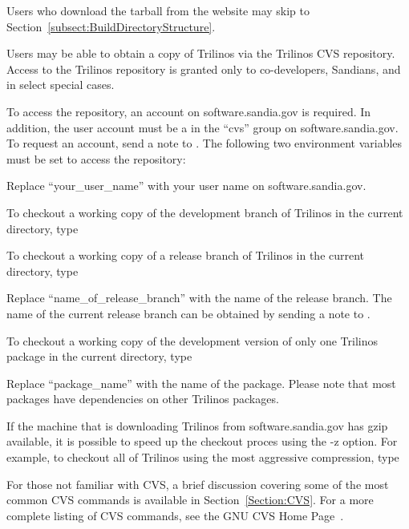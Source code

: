 \documentclass[12pt,relax]{TrilinosUserGuide}
\begin{document}
Users who download the tarball from the website may skip to 
Section~\ref{subsect:BuildDirectoryStructure}. 

Users may be able to obtain a 
copy of Trilinos via the Trilinos CVS repository.  Access to the Trilinos 
repository is granted only to co-developers, Sandians, and in select 
special cases.

To access the repository, an account on software.sandia.gov is required.  In 
addition, the user account must be a in the ``cvs'' group 
on software.sandia.gov.  To request an account, send a note 
to .  
The following two environment variables must be set to access the repository:


Replace ``your\_user\_name'' with your user name on software.sandia.gov.

To checkout a working copy of the development branch of Trilinos in the 
current directory, type


To checkout a working copy of a release branch of Trilinos in the current 
directory, type


Replace ``name\_of\_release\_branch'' with the name of the release branch.
The name of the current release branch can be obtained by sending a note to
\newline {}.

To checkout a working copy of the development version of only one Trilinos 
package in the current directory, type


Replace ``package\_name'' with the name of the package.  Please note 
that most packages have dependencies on other Trilinos packages.

If the machine that is downloading Trilinos from software.sandia.gov has gzip
available, it is possible to speed up the checkout proces using the -z 
option.  For example, to checkout all of Trilinos using the most aggressive
compression, type


For those not familiar with CVS, a brief discussion covering some of the most 
common CVS commands is available in Section~\ref{Section:CVS}.  For a more 
complete listing of CVS commands, see the GNU CVS Home Page~\cite{CVS}.
\end{document}

